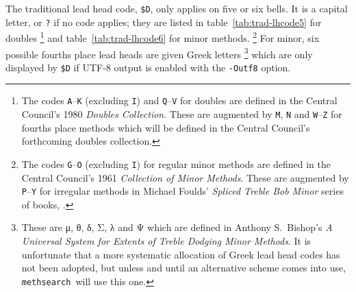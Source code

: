 \documentclass[a4paper,11pt,oneside]{book}
\makeatletter
\newcommand{\oi}[1]{\index{#1@{\hspace*{-\optwidth}\texttt{-}\texttt{#1}}}}
\newcommand{\fspec}[1]{\index{#1@{\hspace*{-\fspecwidth}\texttt{\$#1}}}}
\def\methsearch{\texttt{meth\-search}}
\makeatother
\begin{document}
The traditional lead head code,
\verb+$D+\fspec{D}, only applies on five or six bells.  It is a capital
letter, or \verb+?+ if no code applies; they are listed in 
table~\ref{tab:trad-lhcode5} for doubles%
\footnote{The codes \verb+A+--\verb+K+ (excluding \verb+I+) 
and \verb+Q+--\verb+V+ for doubles are defined in the Central Council's
1980 \textit{Doubles Collection}.%
These are augmented by \verb+M+, \verb+N+ and \verb+W+--\verb+Z+ for
fourths place methods which will be defined in the Central Council's 
forthcoming doubles collection.}
and table~\ref{tab:trad-lhcode6} for minor methods.%
\footnote{The codes \verb+G+--\verb+O+ (excluding \verb+I+) for regular minor 
methods are defined in the Central Council's 1961 
\textit{Collection of Minor Methods}.  These are
augmented by \verb+P+--\verb+Y+ for irregular methods 
in Michael Foulds' \textit{Spliced Treble Bob Minor} series of books,%
.}
For minor, six possible fourths place lead heads are given Greek letters%
\footnote{These are μ, θ, δ, Σ, λ and Ψ which are defined in
Anthony S.\ Bishop's \textit{A Universal System for Extents of Treble
Dodging Minor Methods}.  It is unfortunate that a more
systematic allocation of Greek lead head codes has not been adopted, but
unless and until an alternative scheme comes into use, \methsearch\ will
use this one.}
which are only displayed by \verb+$D+ if UTF-8 output is enabled with the 
\verb+-Outf8+ option.\oi{O}
\end{document}
